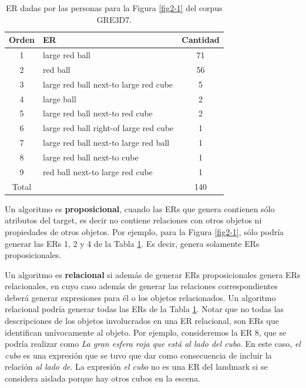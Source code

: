 \begin{table}[h!]
\begin{center}
\begin{tabular}{|c|l|c|}
\hline
 Orden&ER& Cantidad \\
\hline
1&large red ball & 71 \\
2&red ball & 56 \\ 
3&large red ball next-to large red cube & 5 \\ 
4&large ball & 2 \\ 
5&large red ball next-to red cube & 2 \\ 
6&large red ball right-of large red cube & 1 \\ 
7&large red ball next-to large red ball & 1 \\ 
8&large red ball next-to cube & 1 \\ 
9&red ball next-to large red cube & 1 \\ \hline
Total & &140 \\ \hline
\end{tabular}
\caption{ER dadas por las personas para la Figura \ref{fig2-1} del corpus GRE3D7.} 
\label{er-gre3d7-stimulus}
\vspace*{-.5cm}
\end{center}
\end{table}

Un algoritmo es {\bf proposicional}, cuando las ERs que genera contienen s\'olo atributos del target, es decir no contiene relaciones con otros objetos ni propiedades de otros objetos. Por ejemplo, para la Figura \ref{fig2-1}, s\'olo podr\'ia generar las ERs 1, 2 y 4 de la Tabla \ref{er-gre3d7-stimulus}. Es decir, genera solamente ERs proposicionales.

Un algoritmo es {\bf relacional} si adem\'as de generar ERs proposicionales genera ERs relacionales, en cuyo caso adem\'as de generar las relaciones correspondientes deber\'a generar expresiones para \'el o los objetos relacionados. Un algoritmo relacional podr\'ia generar todas las ERs de la Tabla \ref{er-gre3d7-stimulus}. Notar que no todas las descripciones de los objetos involucrados en una ER relacional, son ERs que identifican un\'ivocamente al objeto. Por ejemplo, consideremos la ER 8, que se podr\'ia realizar como {\it La gran esfera roja que est\'a al lado del cubo}. En este caso, {\it el cubo} es una expresi\'on que se tuvo que dar como consecuencia de incluir la relaci\'on {\it al lado de}. La expresi\'on {\it el cubo} no es una ER del landmark si se considera aislada porque hay otros cubos en la escena. 

